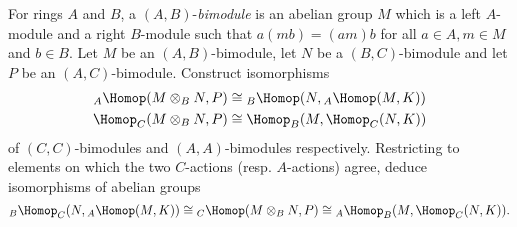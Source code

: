 \documentclass[../main.tex]{subfiles}
\begin{document}
\begin{exe}\label{exe:homtensoradjunction}
    For rings $A$ and $B$, a $(A,B)$-\emph{bimodule} is an abelian group $M$ which is a left $A$-module and a right $B$-module such that $a(mb) = (am)b$ for all $a\in A, m\in M$ and $b\in B$. Let $M$ be an $(A, B)$-bimodule, let $N$ be a $(B,C)$-bimodule and let $P$ be an $(A,C)$-bimodule. Construct isomorphisms
    \begin{align*}
        \leftmoduleHom{A}(M\otimes_B N, P) &\cong \leftmoduleHom{B}(N, \leftmoduleHom{A}(M, K)) \\ 
        \rightmoduleHom{C}(M\otimes_B N, P) &\cong \rightmoduleHom{B}(M, \rightmoduleHom{C}(N, K))
    \end{align*}
    of $(C, C)$-bimodules and $(A, A)$-bimodules respectively. Restricting to elements on which the two $C$-actions (resp. $A$-actions) agree, deduce isomorphisms of abelian groups
    \[\bimoduleHom{B}{C}(N, \leftmoduleHom{A}(M,K)) \cong \leftmoduleHom{C}(M\otimes_B N, P) \cong \bimoduleHom{A}{B}(M, \rightmoduleHom{C}(N,K))\text{.}\]
\end{exe}
\end{document}
